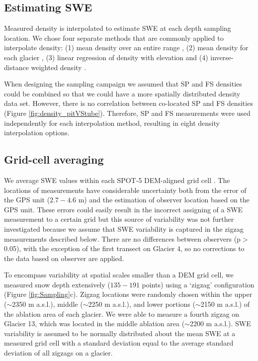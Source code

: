 \documentclass[twocolumn,letterpaper]{igs}
\begin{document}
\subsection{Estimating SWE}

Measured density is interpolated to estimate SWE at each depth sampling location. We chose four separate methods that are commonly applied to interpolate density: (1) mean density over an entire range \citep[e.g.][]{Cullen2017}, (2) mean density for each glacier \citep[e.g.][]{Elder1991, McGrath2015}, (3) linear regression of density with elevation \citep[e.g.][]{Elder1998, Molotch2005} and (4) inverse-distance weighted density \citep[e.g.][]{Molotch2005}. 

When designing the sampling campaign we assumed that SP and FS densities could be combined so that we could have a more spatially distributed density data set. However, there is no correlation between co-located SP and FS densities (Figure \ref{fig:density_pitVStube}). Therefore, SP and FS measurements were used independently for each interpolation method, resulting in eight density interpolation options. 

\subsection{Grid-cell averaging}

We average SWE values within each SPOT-5 DEM-aligned grid cell \citep{Korona2009}. The locations of measurements have considerable uncertainty both from the error of the GPS unit ($2.7 - 4.6$ m) and the estimation of observer location based on the GPS unit. These errors could easily result in the incorrect assigning of a SWE measurement to a certain grid but this source of variability was not further investigated because we assume that SWE variability is captured in the zigzag measurements described below. There are no differences between observers (p$>$0.05), with the exception of the first transect on Glacier 4, so no corrections to the data based on observer are applied.

To encompass variability at spatial scales smaller than a DEM grid cell, we measured snow depth extensively ($135-191$ points) using a `zigzag' configuration (Figure \ref{fig:Sampling}c). Zigzag locations were randomly chosen within the upper ($\sim$2350 m a.s.l.), middle ($\sim$2250 m a.s.l.), and lower portions ($\sim$2150 m a.s.l.) of the ablation area of each glacier. We were able to measure a fourth zigzag on Glacier 13, which was located in the middle ablation area ($\sim$2200 m a.s.l.). SWE variability is assumed to be normally distributed about the mean SWE at a measured grid cell with a standard deviation equal to the average standard deviation of all zigzags on a glacier.
\end{document}
